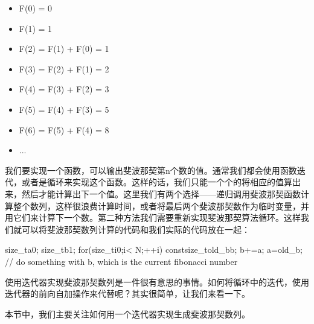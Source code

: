 \begin{itemize}
\item F(0) = 0

\item F(1) = 1

\item F(2) = F(1) + F(0) = 1

\item F(3) = F(2) + F(1) = 2

\item F(4) = F(3) + F(2) = 3

\item F(5) = F(4) + F(3) = 5

\item F(6) = F(5) + F(4) = 8

\item ...

\end{itemize}

我们要实现一个函数，可以输出斐波那契第n个数的值。通常我们都会使用函数迭代，或者是循环来实现这个函数。这样的话，我们只能一个个的将相应的值算出来，然后才能计算出下一个值。这里我们有两个选择——递归调用斐波那契函数计算整个数列，这样很浪费计算时间，或者将最后两个斐波那契数作为临时变量，并用它们来计算下一个数。第二种方法我们需要重新实现斐波那契算法循环。这样我们就可以将斐波那契数列计算的代码和我们实际的代码放在一起：

\begin{codebox}[cpp]
size_ta{0};
size_tb{1};
for(size_ti{0};i< N;++i){
    constsize_told_b{b};
    b+=a;
    a=old_b;
    // do something with b, which is the current fibonacci number
}
\end{codebox}

使用迭代器实现斐波那契数列是一件很有意思的事情。如何将循环中的迭代，使用迭代器的前向自加操作来代替呢？其实很简单，让我们来看一下。


本节中，我们主要关注如何用一个迭代器实现生成斐波那契数列。

